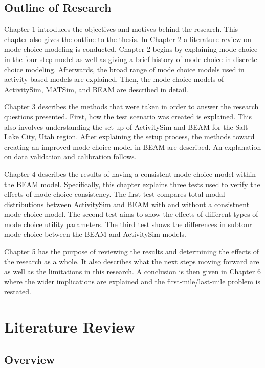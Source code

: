 \documentclass[12pt, oneside, openright]{byuthesis}
\begin{document}
\hypertarget{outline}{%
\section{Outline of Research}\label{outline}}

Chapter 1 introduces the objectives and motives behind the research. This chapter also gives the outline to the thesis. In Chapter 2 a literature review on mode choice modeling is conducted. Chapter 2 begins by explaining mode choice in the four step model as well as giving a brief history of mode choice in discrete choice modeling. Afterwards, the broad range of mode choice models used in activity-based models are explained. Then, the mode choice models of ActivitySim, MATSim, and BEAM are described in detail.

Chapter 3 describes the methods that were taken in order to answer the research questions presented. First, how the test scenario was created is explained. This also involves understanding the set up of ActivitySim and BEAM for the Salt Lake City, Utah region. After explaining the setup process, the methods toward creating an improved mode choice model in BEAM are described. An explanation on data validation and calibration follows.

Chapter 4 describes the results of having a consistent mode choice model within the BEAM model. Specifically, this chapter explains three tests used to verify the effects of mode choice consistency. The first test compares total modal distributions between ActivitySim and BEAM with and without a consistnent mode choice model. The second test aims to show the effects of different types of mode choice utility parameters. The third test shows the differences in subtour mode choice between the BEAM and ActivitySim models.

Chapter 5 has the purpose of reviewing the results and determining the effects of the research as a whole. It also describes what the next steps moving forward are as well as the limitations in this research. A conclusion is then given in Chapter 6 where the wider implications are explained and the first-mile/last-mile problem is restated.

\hypertarget{literature-review}{%
\chapter{Literature Review}\label{literature-review}}

\hypertarget{overview}{%
\section{Overview}\label{overview}}
\end{document}
